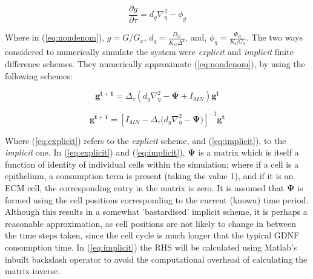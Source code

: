 \documentclass[pdftex,10pt,a4paper]{article}
\begin{document}
\begin{equation}\label{eq:nondenom}
\frac{\partial g}{\partial \tau} = d_g \nabla_\eta^2 - \phi_g
\end{equation}

Where in (\ref{eq:nondenom}), $g = G/G_x$, $d_g = \frac{D_G}{K_G \Delta^2}$, and, $\phi_g = \frac{\Phi_G}{K_G G_x}$. The two ways considered to numerically simulate the system were \emph{explicit} and \emph{implicit} finite difference schemes. They numerically approximate (\ref{eq:nondenom}), by using the following schemes:

\begin{equation}\label{eq:explicit}
\mathbf{g^{t+1}} = \Delta_\tau (d_g \nabla_\eta^2 - \mathbf{\Psi} + {I_{MN}})\mathbf{g^t} 
\end{equation}

\begin{equation}\label{eq:implicit}
\mathbf{g^{t+1}} = [{I_{MN} - \Delta_\tau (d_g \nabla_\eta^2 - \mathbf{\Psi}})]^{-1}\mathbf{g^t} 
\end{equation}

Where (\ref{eq:explicit}) refers to the \emph{explicit} scheme, and (\ref{eq:implicit}), to the \emph{implicit} one. In (\ref{eq:explicit}) and (\ref{eq:implicit}), $\mathbf{\Psi}$ is a matrix which is itself a function of identity of individual cells within the simulation; where if a cell is a epithelium, a consumption term is present (taking the value 1), and if it is an ECM cell, the corresponding entry in the matrix is zero. It is assumed that $\mathbf{\Psi}$ is formed using the cell positions corresponding to the current (known) time period. Although this results in a somewhat 'bastardised' implicit scheme, it is perhaps a reasonable approximation, as cell positions are not likely to change in between the time steps taken, since the cell cycle is much longer that the typical GDNF consumption time. In (\ref{eq:implicit}) the RHS will be calculated using Matlab's inbuilt backslash operator to avoid the computational overhead of calculating the matrix inverse.
\end{document}
